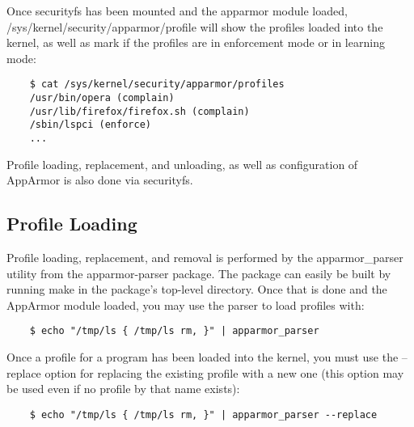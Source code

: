 \documentclass[a4paper]{article}
\renewcommand{\H}{\hspace{0pt}}
\begin{document}
Once securityfs has been mounted and the apparmor module loaded,
/sys/{\H}kernel/{\H}security/{\H}apparmor/{\H}profile will show the
profiles loaded into the kernel, as well as mark if the profiles are in
enforcement mode or in learning mode:

\begin{small}
\begin{verbatim}
    $ cat /sys/kernel/security/apparmor/profiles
    /usr/bin/opera (complain)
    /usr/lib/firefox/firefox.sh (complain)
    /sbin/lspci (enforce)
    ...
\end{verbatim}
\end{small}

Profile loading, replacement, and unloading, as well as configuration of
AppArmor is also done via securityfs.


\subsection{Profile Loading}

Profile loading, replacement, and removal is performed by the
apparmor\_parser utility from the apparmor-parser package. The
package can easily be built by running make in the package's top-level
directory.  Once that is done and the AppArmor module loaded, you may
use the parser to load profiles with:

\begin{small}
\begin{verbatim}
    $ echo "/tmp/ls { /tmp/ls rm, }" | apparmor_parser
\end{verbatim}
\end{small}

Once a profile for a program has been loaded into the kernel, you must
use the --replace option for replacing the existing profile with a new
one (this option may be used even if no profile by that name exists):

\begin{small}
\begin{verbatim}
    $ echo "/tmp/ls { /tmp/ls rm, }" | apparmor_parser --replace
\end{verbatim}
\end{small}
\end{document}
